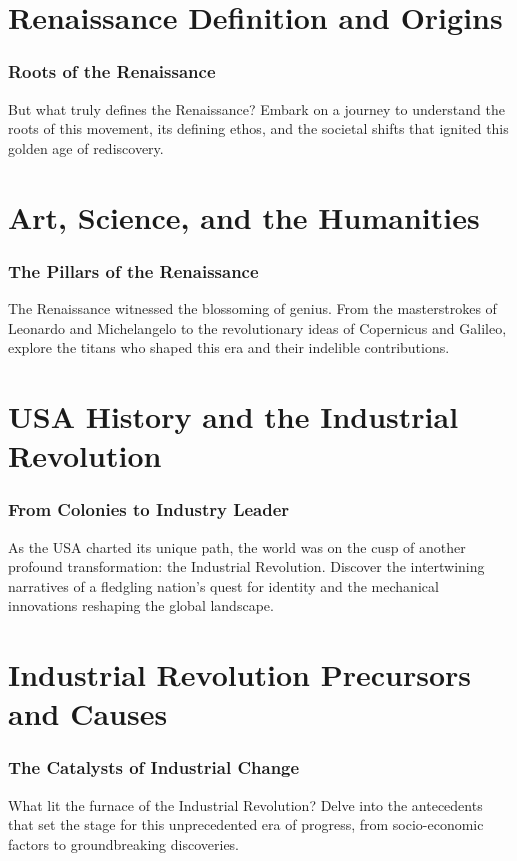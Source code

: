 \documentclass[a4paper,12pt]{book}
\begin{document}
\chapter{Renaissance Definition and Origins}
\subsection*{Roots of the Renaissance}
But what truly defines the Renaissance? Embark on a journey to understand the roots of this movement, its defining ethos, and the societal shifts that ignited this golden age of rediscovery.

\chapter{Art, Science, and the Humanities}
\subsection*{The Pillars of the Renaissance}
The Renaissance witnessed the blossoming of genius. From the masterstrokes of Leonardo and Michelangelo to the revolutionary ideas of Copernicus and Galileo, explore the titans who shaped this era and their indelible contributions.



\chapter{USA History and the Industrial Revolution}
\subsection*{From Colonies to Industry Leader}
As the USA charted its unique path, the world was on the cusp of another profound transformation: the Industrial Revolution. Discover the intertwining narratives of a fledgling nation's quest for identity and the mechanical innovations reshaping the global landscape.

\chapter{Industrial Revolution Precursors and Causes}
\subsection*{The Catalysts of Industrial Change}
What lit the furnace of the Industrial Revolution? Delve into the antecedents that set the stage for this unprecedented era of progress, from socio-economic factors to groundbreaking discoveries.
\end{document}

